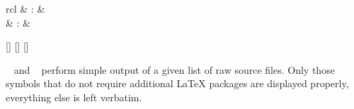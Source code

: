 \begin{isabellebody}
\begin{isamarkuptext}
\begin{itemize}
  \end{itemize}%
\end{isamarkuptext}%
\isamarkuptrue%
%
\isamarkuptrue%
%
\begin{isamarkuptext}%
\begin{matharray}{rcl}
    \hypertarget{command.display-drafts}{\hyperlink{command.display-drafts}{\mbox{}}} & : &  \\
    \hypertarget{command.print-drafts}{\hyperlink{command.print-drafts}{\mbox{}}} & : &  \\
  \end{matharray}

  \begin{railoutput}
\rail@bar
{}[]
[]
\rail@endbar
\rail@plus
{}[]
\rail@endplus
\rail@end
\end{railoutput}


  \begin{description}

  \item \hyperlink{command.display-drafts}{\mbox{}}~ and \hyperlink{command.print-drafts}{\mbox{}}~ perform simple output of a given list
  of raw source files.  Only those symbols that do not require
  additional {\LaTeX} packages are displayed properly, everything else
  is left verbatim.

  \end{description}%
\end{isamarkuptext}%
\isamarkuptrue%
%
\isadelimtheory
%
\endisadelimtheory
%
\isatagtheory
{}\isamarkupfalse%
%
\endisatagtheory
{\isafoldtheory}%
%
\isadelimtheory
%
\endisadelimtheory
\isanewline
\end{isabellebody}%
